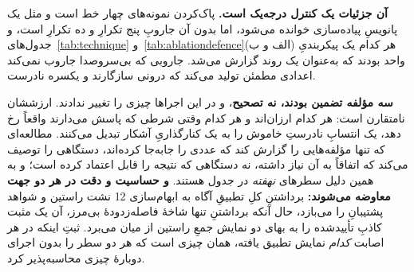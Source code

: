 \textbf{آن جزئیات  یک کنترل درجه‌یک است.} پاک‌کردن 
نمونه‌های  چهار خط است و مثل یک پانویسِ پیاده‌سازی خوانده
می‌شود، اما بدون آن جاروبِ  پنج تکرارِ  و 
ده تکرارِ  است، و جدول‌های~\ref{tab:technique}
و~\ref{tab:ablationdefence}(الف و ب) هر کدام یک پیکربندیِ واحد بودند که
به‌عنوان یک روند گزارش می‌شد. جاروبی که بی‌سروصدا جاروب نمی‌کند اعدادی
مطمئن تولید می‌کند که درونی سازگارند و یکسره نادرست.

\textbf{سه مؤلفه تضمین بودند، نه تصحیح}، و در این اجراها چیزی را تغییر
ندادند. ارزششان نامتقارن است: هر کدام ارزان‌اند و هر کدام وقتی شرطی که
پاسش می‌دارند واقعاً رخ دهد، یک انتسابِ نادرستِ خاموش را به یک
کنارگذاریِ آشکار تبدیل می‌کنند. مطالعه‌ای که تنها مؤلفه‌هایی را گزارش کند
که عددی را جابه‌جا کرده‌اند، دستگاهی را توصیف می‌کند که اتفاقاً به آن نیاز
داشته، نه دستگاهی که نتیجه را قابل اعتماد کرده است؛ و به همین دلیل
سطرهای \emph{نهفته} در جدول هستند. \textbf{و حساسیت و دقت در هر دو جهت
معاوضه می‌شوند:} برداشتنِ کلِ تطبیقِ آگاه به ابهام‌سازی \num{12} نشت راستین
و شواهد پشتیبانِ  را می‌بازد، حال آنکه برداشتنِ تنها شاخهٔ
فاصله‌زدودهٔ بی‌مرز، آن یک مثبت کاذبِ تأییدشده را به بهای دو نمایش جمعِ
راستین از میان می‌برد. ثبتِ اینکه در هر اصابت \emph{کدام} نمایش تطبیق
یافته، همان چیزی است که هر دو سطر را بدون اجرای دوبارهٔ چیزی محاسبه‌پذیر
کرد.
